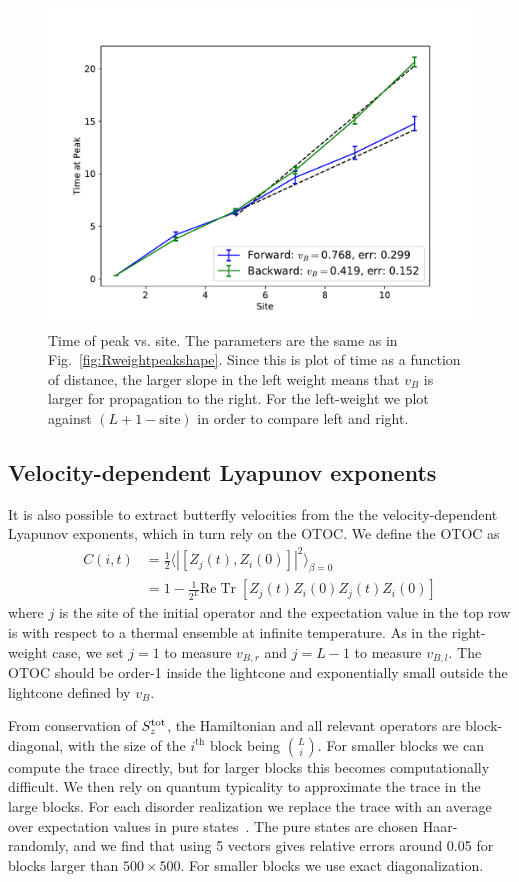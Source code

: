 \documentclass[aps,prx,reprint,superscriptaddress, longbibliography]{revtex4-1}
\newcommand{\charlie}[1]{{\color{Magenta}{{#1}}}}
\newcommand{\Tr}{ \mbox{Tr}}
\renewcommand{\Re}{ \mbox{Re}}
\newcommand{\Sz}{S_z^{\rm tot}}
\newcommand{\half}{\frac{1}{2}}
\begin{document}
\begin{figure}
	\includegraphics[width=\columnwidth]{Rweightpeaktimes}
	\caption{Time of peak vs. site. The parameters are the same as in Fig.~\ref{fig:Rweightpeakshape}. Since this is plot of time as a function of distance, the larger slope in the left weight means that $v_B$ is larger for propagation to the right. For the left-weight we plot against $(L+1-\text{site})$ in order to compare left and right.}
	\label{fig:Rweightpeaktimes}
\end{figure}

\subsection{Velocity-dependent Lyapunov exponents}

It is also possible to extract butterfly velocities from the the velocity-dependent Lyapunov exponents, which in turn rely on the OTOC. We define the OTOC as 
\begin{align}
C(i,t) & = \half \langle|[Z_j(t),Z_i(0)]|^2\rangle_{\beta=0}\nonumber\\
&= 1 - \frac{1}{2^{L}}\Re\;\Tr\;[Z_j(t)Z_i(0)Z_j(t)Z_i(0)]
\end{align}
where $j$ is the site of the initial operator and the expectation value in the top row is with respect to a thermal ensemble at infinite temperature. As in the right-weight case, we set $j=1$ to measure $v_{B,r}$ and $j=L-1$ to measure $v_{B,l}$. The OTOC should be order-1 inside the lightcone and exponentially small outside the lightcone defined by $v_B$.

\charlie{Move this paragraph to an appendix?}
From conservation of $\Sz$, the Hamiltonian and all relevant operators are block-diagonal, with the size of the $i^\text{th}$ block being $\binom{L}{i}$. For smaller blocks we can compute the trace directly, but for larger blocks this becomes computationally difficult. We then rely on quantum typicality to approximate the trace in the large blocks. For each disorder realization we replace the trace with an average over expectation values in pure states~\cite{Luitz2017}. The pure states are chosen Haar-randomly, and we find that using 5 vectors gives relative errors around 0.05 for blocks larger than $500\times 500$. For smaller blocks we use exact diagonalization.
\end{document}
